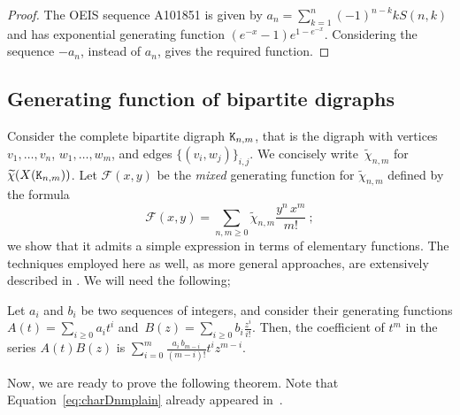 \documentclass{amsart}
\begin{document}
\begin{thm}
\begin{proof}
 The OEIS sequence A101851 \cite{OEIS} is given by $a_n=\sum_{k=1}^{n}(-1)^{n-k}kS(n,k)$ and has exponential generating function ${(e^{-x}-1)e^{1-e^{-x}}}$. Considering the sequence $-a_{n}$, instead of $a_n$, gives the required function.
 \end{proof}
 \end{thm}
 
 \subsection{Generating function of bipartite digraphs}\label{sec:genfunbip}

Consider the complete bipartite digraph ${\tt K}_{n,m}$, that is the digraph with vertices~$v_1,\dots,v_n$, $w_1,\dots,w_m$, and edges  $\{ (v_i, w_j )\}_{i,j}$. We concisely write~$\widetilde{\chi}_{n,m}$ for $\widetilde{\chi}(X({\tt K}_{n,m}))$.
Let $\mathcal{F}(x,y)$ be the \emph{mixed} generating function for $\widetilde{\chi}_{n,m}$ defined by the formula
\[\mathcal{F}(x,y)=\sum_{n,m \geq 0} \widetilde{\chi}_{n,m}\frac{y^n \,x^m}{m!}\ ;\]
we show that it admits a simple expression in terms of elementary functions.
The techniques employed here as well, as more general approaches, are extensively described in \cite{genfun}. We will need the following;

\begin{rem}\label{rem:prodser}
Let $a_i$ and $b_i$ be two sequences of integers, and consider their generating functions $A(t)=\sum_{i\geq 0} a_i t^i$ and~$B(z)=\sum_{i\geq 0} b_i \frac{z^i}{i!}$. Then, the coefficient of $t^m$ in the series $A(t)B(z)$ is
$\sum_{i=0}^m \frac{a_i \, b_{m-i}}{(m-i)!} t^i z^{m-i}$.
\end{rem}

Now, we are ready to prove the following theorem. Note that Equation~\eqref{eq:charDnmplain} already appeared in~\cite[Section~2]{MatchingChess}.
\end{document}
